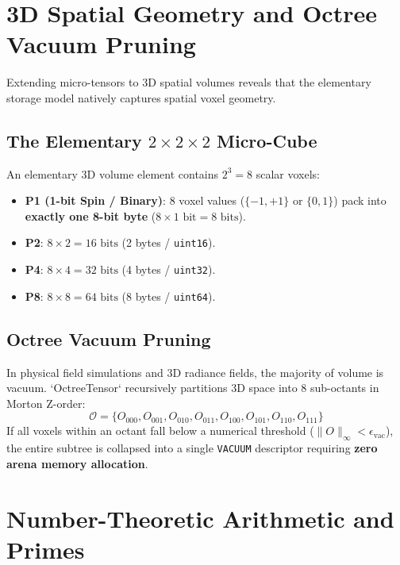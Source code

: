 \documentclass[11pt,a4paper]{article}
\begin{document}
\section{3D Spatial Geometry and Octree Vacuum Pruning}

Extending micro-tensors to 3D spatial volumes reveals that the elementary storage model natively captures spatial voxel geometry.

\subsection{The Elementary \texorpdfstring{$2\times 2\times 2$}{2x2x2} Micro-Cube}
An elementary 3D volume element contains $2^3 = 8$ scalar voxels:
\begin{itemize}
    \item \textbf{P1 (1-bit Spin / Binary)}: 8 voxel values ($\{-1, +1\}$ or $\{0, 1\}$) pack into \textbf{exactly one 8-bit byte} ($8 \times 1\text{ bit} = 8\text{ bits}$).
    \item \textbf{P2}: $8 \times 2 = 16\text{ bits}$ (2 bytes / \texttt{uint16}).
    \item \textbf{P4}: $8 \times 4 = 32\text{ bits}$ (4 bytes / \texttt{uint32}).
    \item \textbf{P8}: $8 \times 8 = 64\text{ bits}$ (8 bytes / \texttt{uint64}).
\end{itemize}

\subsection{Octree Vacuum Pruning}
In physical field simulations and 3D radiance fields, the majority of volume is vacuum. `OctreeTensor` recursively partitions 3D space into 8 sub-octants in Morton Z-order:
\begin{equation}
\mathcal{O} = \{O_{000}, O_{001}, O_{010}, O_{011}, O_{100}, O_{101}, O_{110}, O_{111}\}
\end{equation}
If all voxels within an octant fall below a numerical threshold ($\|O\|_\infty < \epsilon_{\text{vac}}$), the entire subtree is collapsed into a single \texttt{VACUUM} descriptor requiring \textbf{zero arena memory allocation}.

\section{Number-Theoretic Arithmetic and Primes}
\end{document}
